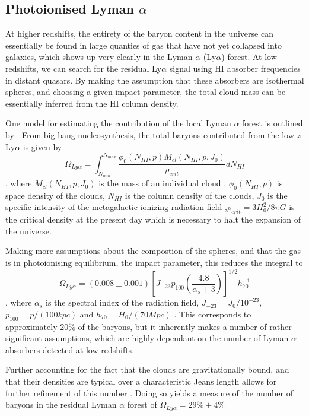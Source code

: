 \subsection{Photoionised Lyman $\alpha$}
At higher redshifts, the entirety of the baryon content in the universe can essentially be found in large quanties of gas that have not yet collapsed into galaxies, which shows up very clearly in the Lyman $\alpha$ (Ly$\alpha$) forest. At low redshifts, we can search for the residual Ly$\alpha$ signal using HI absorber frequencies in distant quasars. By making the assumption that these absorbers are isothermal spheres, and choosing a given impact parameter, the total cloud mass can be essentially inferred from the HI column density. 

\par One model for estimating the contribution of the local Lyman $\alpha$ forest is outlined by \cite{2000ApJ...544..150P}. From big bang nucleosynthesis, the total baryons contributed from the low-$z$ Ly$\alpha$ is given by 
$$\Omega_{Ly\alpha} = \int_{N_{min}}^{N_{max}} \frac{ \phi_0(N_{HI},p) M_{cl}(N_{HI}, p, J_0)}{\rho_{crit}} dN_{HI} $$
, where $M_{cl}(N_{HI}, p, J_0)$ is the mass of an individual cloud , $\phi_0(N_{HI},p)$ is space density of the clouds, $N_{HI}$ is the column density of the clouds, $J_0$ is the specific intensity of the metagalactic ionizing radiation field ,$\rho_{crit} = 3 H_0^2/8 \pi G $ is the critical density at the present day which is necessary to halt the expansion of the universe.
\par Making more assumptions about the compostion of the spheres, and that the gas is in photoionising equilibrium, the impact parameter, this reduces the integral to
$$\Omega_{Ly\alpha} = (0.008 \pm 0.001) \left[ J_{-23} p_100 \left(\frac{ 4.8}{ \alpha_s + 3} \right) \right]^{1/2} h_{70}^{-1} $$
, where $\alpha_s$ is the spectral index of the radiation field, $J_{-23}= J_0/10^{-23}$, $p_{100} = p/(100 kpc)$ and $h_{70} = H_0/(70 Mpc)$ . This corresponds to approximately $20\%$ of the baryons, but it inherently makes a number of rather significant assumptions, which are highly dependant on the number of Lyman $\alpha$ absorbers detected at low redshifts. 
\par Further accounting for the fact that the clouds are gravitationally bound, and that their densities are typical over a characteristic Jeans length allows for further refinement of this number \citep{2001ApJ...559..507S}. Doing so yields a measure of the number of baryons in the residual Lyman $\alpha$ forest of $\Omega_{Ly\alpha} = 29 \% \pm 4\%$ \citep{ 2004ApJS..152...29P,2008ApJ...679..194D}  
